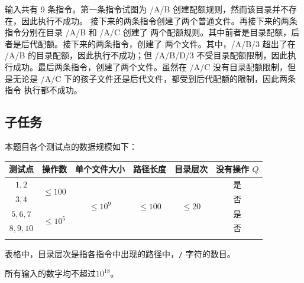 \examplebox*{}{}

输入共有 9 条指令。第一条指令试图为 /A/B 创建配额规则，然而该目录并不存在，因此执行不成功。
接下来的两条指令创建了两个普通文件。再接下来的两条指令分别在目录 /A/B 和 /A/C 创建了
两个配额规则。其中前者是目录配额，后者是后代配额。接下来的两条指令，创建了
两个文件。其中，/A/B/3 超出了在 /A/B 的目录配额，因此执行不成功；但 /A/B/D/3
不受目录配额限制，因此执行成功。最后两条指令，创建了两个文件。虽然在 /A/C
没有目录配额限制，但是无论是 /A/C 下的孩子文件还是后代文件，都受到后代配额的限制，因此两条指令
执行都不成功。

\subsection*{子任务}

本题目各个测试点的数据规模如下：

\begin{table}[H]
    \centering
    \begin{tabular}{c|c|c|c|c|c}
        \thickhline
        测试点   & 操作数                      & 单个文件大小                & 路径长度                   & 目录层次                  & 没有操作 $Q$ \\ \hline
        $1,2$    & \multirow{2}{*}{$\le 100$}  & \multirow{4}{*}{$\le 10^9$} & \multirow{4}{*}{$\le 100$} & \multirow{4}{*}{$\le 20$} & 是           \\ \cline{1-1} \cline{6-6}
        $3,4$    &                             &                             &                            &                           & 否           \\ \cline{1-2} \cline{6-6}
        $5,6,7$  & \multirow{2}{*}{$\le 10^5$} &                             &                            &                           & 是           \\ \cline{1-1} \cline{6-6}
        $8,9,10$ &                             &                             &                            &                           & 否           \\ \thickhline
    \end{tabular}
\end{table}

表格中，目录层次是指各指令中出现的路径中，\verb|/| 字符的数目。

所有输入的数字均不超过$10^{18}$。



